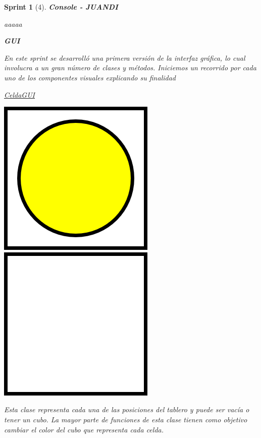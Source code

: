 \documentclass{article}
\theoremstyle{break}
\newtheorem*{sprint}{Sprint}
\begin{document}
\begin{sprint}[4]
\textbf{Console - JUANDI}

aaaaa

\textbf{GUI}

En este sprint se desarrolló una primera versión de la interfaz gráfica, lo cual involucra a un gran número de clases y métodos. Iniciemos un recorrido por cada uno de los componentes visuales explicando su finalidad

\underline{CeldaGUI}
\begin{center}
\includegraphics[scale=0.5]{yellowCube.png}
\includegraphics[scale=0.5]{emptyCell.png}
\end{center}

Esta clase representa cada una de las posiciones del tablero y puede ser vacía o tener un cubo. La mayor parte de funciones de esta clase  tienen como objetivo cambiar el color del cubo que representa cada celda.


\end{sprint}
\end{document}
